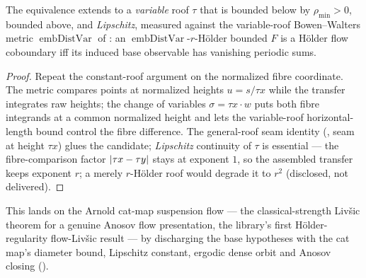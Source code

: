 \begin{theorem}\label{livsic_holderFlow_varRoof}
  \leanok
  The equivalence extends to a \emph{variable} roof \(\tau\) that is bounded below by
  \(\rho_{\min} > 0\), bounded above, and \emph{Lipschitz}, measured against the variable-roof
  Bowen--Walters metric \(\operatorname{embDistVar}\) of : an
  \(\operatorname{embDistVar}\)-\(r\)-Hölder bounded \(F\) is a Hölder flow coboundary iff its induced
  base observable has vanishing periodic sums.
\end{theorem}
\begin{proof}\leanok
  Repeat the constant-roof argument on the normalized fibre coordinate. The metric compares points at
  normalized heights \(u = s/\tau x\) while the transfer integrates raw heights; the change of variables
  \(\sigma = \tau x\cdot w\) puts both fibre integrands at a common normalized height and lets the
  variable-roof horizontal-length bound control the fibre difference. The general-roof seam identity
  (, seam at height \(\tau x\)) glues the candidate; \emph{Lipschitz}
  continuity of \(\tau\) is essential --- the fibre-comparison factor \(\left\lvert \tau x - \tau y \right\rvert\) stays at
  exponent \(1\), so the assembled transfer keeps exponent \(r\); a merely \(r\)-Hölder roof would
  degrade it to \(r^2\) (disclosed, not delivered).
\end{proof}

This lands on the Arnold cat-map suspension flow --- the classical-strength Livšic theorem for a
genuine Anosov flow presentation, the library's first Hölder-regularity flow-Livšic result --- by
discharging the base hypotheses with the cat map's diameter bound, Lipschitz constant, ergodic dense
orbit and Anosov closing ().

